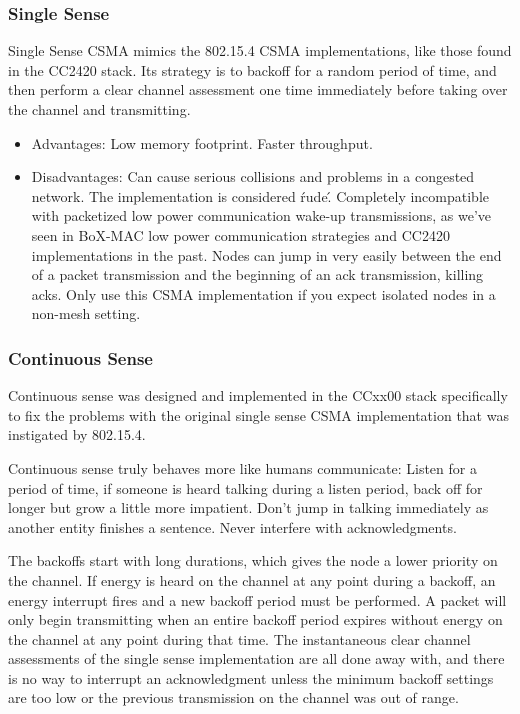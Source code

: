 \documentclass{article}
\begin{document}
\subsubsection{Single Sense}
\label{sec:singlesense}
Single Sense CSMA mimics the 802.15.4 CSMA implementations, like those
found in the CC2420 stack.  Its strategy is to backoff for a random
period of time, and then perform a clear channel assessment one time immediately before taking over the channel and transmitting.

\begin{itemize}
  \item Advantages: Low memory footprint. Faster throughput.
  \item Disadvantages: Can cause serious collisions and problems in a 
  congested network. The implementation is considered \'rude\'. 
  Completely incompatible with packetized low power communication wake-up 
  transmissions, as we've seen in BoX-MAC low power communication 
  strategies and CC2420 implementations in the past. Nodes can 
  jump in very easily between the end of a packet transmission
  and the beginning of an ack transmission, killing acks. Only use this
  CSMA implementation if you expect isolated nodes in a non-mesh
  setting.
\end{itemize}

\subsubsection{Continuous Sense}
\label{sec:continuoussense}
Continuous sense was designed and implemented in the CCxx00 stack
specifically to fix the problems with the original single sense CSMA implementation that was instigated by 802.15.4.

Continuous sense truly behaves more like humans communicate: Listen
for a period of time, if someone is heard talking during a listen period,
back off for longer but grow a little more impatient. Don't jump
in talking immediately as another entity finishes a sentence. Never interfere with acknowledgments.

The backoffs start with long durations, which gives the node a lower
priority on the channel. If energy is heard on the channel at any point
during a backoff, an energy interrupt fires and a new backoff period 
must be performed. A packet will only begin transmitting when an 
entire backoff period expires without energy on the channel at any point
during that time. The instantaneous clear channel assessments of the
single sense implementation are all done away with, and there is no way
to interrupt an acknowledgment unless the minimum backoff settings are too low or the previous transmission on the channel was out of range.
\end{document}
